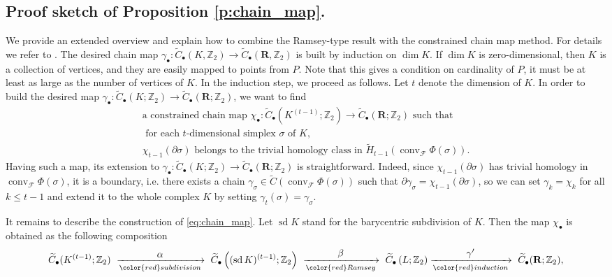 \documentclass[a4paper,12pt]{amsart}
\newcommand{\Z}{\mathbb{Z}} 	%
\DeclareMathOperator\sd{sd}
\newcommand{\pth}[1]{\left( #1 \right)}
\newcommand{\skel}[2]{#2^{(#1)}}
\DeclareMathOperator{\conv}{conv}
\theoremstyle{definition}
\begin{document}
\subsection{Proof sketch of Proposition \ref{p:chain_map}.} We provide an extended overview and explain how to combine the Ramsey-type result with the constrained chain map method. For details we refer to \cite{bettiRadon}. The desired chain map $\gamma_\bullet\colon \widetilde C_\bullet(K,\Z_2)\to \widetilde C_\bullet(\mathbf{R}, \Z_2)$ is built by induction on $\dim K$.
If $\dim K$ is zero-dimensional, then $K$ is a collection of vertices, and they are easily mapped to points from $P$.  Note that this gives a condition on cardinality of $P$, it must be at least as large as the number of vertices of $K$.
In the induction step, we proceed as follows. 
Let $t$ denote the dimension of $K$. In order to build the desired map $\gamma_\bullet \colon \widetilde C_\bullet(K;\Z_2) \to \widetilde C_\bullet(\mathbf{R};\Z_2)$, we want to find 
%
 \begin{gather*}
  \text{a constrained chain map } \chi_\bullet \colon \widetilde C_\bullet(K^{(t-1)};\Z_2) \to \widetilde C_\bullet(\mathbf{R};\Z_2) \text{ such that }\\  \text{ for each $t$-dimensional simplex $\sigma$ of $K$,}\\   \chi_{t-1}(\partial \sigma)  \text{ belongs to the trivial homology class in }  \widetilde H_{t-1}(\conv_{\mathcal F}\Phi(\sigma)). %
\tag{$\clubsuit$}\label{eq:chain_map}
\end{gather*}
%
%
Having such a map, its extension to $\gamma_\bullet \colon \widetilde C_\bullet(K;\Z_2) \to \widetilde C_\bullet(\mathbf{R};\Z_2)$ is straightforward. Indeed, since $\chi_{t-1}(\partial \sigma)$ has trivial homology in $\conv_{\mathcal F}\Phi(\sigma)$, it is a boundary, i.e. there exists a chain $\gamma_\sigma\in\widetilde C(\conv_{\mathcal F}\Phi(\sigma))$ such that $\partial \gamma_\sigma = \chi_{t-1}(\partial \sigma)$, so we can 
set $\gamma_k=\chi_k$ for all $k\leq t-1$ and extend it to the whole complex $K$ by setting $\gamma_{t}(\sigma) = \gamma_\sigma$.


It remains to describe the construction of \eqref{eq:chain_map}. Let $\sd K$ stand for the barycentric subdivision of $K$. Then the map $\chi_\bullet$ is obtained as the following composition
\[
\widetilde C_\bullet(K^{(t-1)};\Z_2) \  \xrightarrow[{\color{red}subdivision}]{\makebox[2em]{$\alpha$}}
\  \widetilde C_\bullet\pth{\skel{t-1}{(\sd K)}; \Z_2} \ 
\xrightarrow[{\color{red}Ramsey}]{\makebox[3em]{$\beta$}} \ 
\widetilde C_\bullet\pth{L; \Z_2} \xrightarrow[{\color{red} induction}]{\makebox[2em]{$\gamma'$}} \  \widetilde C_\bullet(\mathbf{R};\Z_2),
\]
\end{document}
